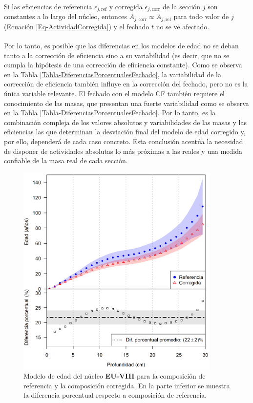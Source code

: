 Si las eficiencias de referencia $\epsilon_{j, \text{ref}}$ y corregida $\epsilon_{j, \text{corr}}$ de la sección $j$ son constantes a lo largo del núcleo, entonces $A_{j, \text{corr}} \propto A_{j, \text{ref}}$ para todo valor de $j$ (Ecuación \ref{Eq-ActividadCorregida}) y el fechado $t$ no se ve afectado.
\\
\\
Por lo tanto, es posible que las diferencias en los modelos de edad no se deban tanto a la corrección de eficiencia sino a su variabilidad (es decir, que no se cumpla la hipótesis de una corrección de eficiencia constante). Como se observa en la Tabla \ref{Tabla-DiferenciasPorcentualesFechado}, la variabilidad de la corrección de eficiencia también influye en la corrección del fechado, pero no es la única variable relevante. El fechado con el modelo CF también requiere el conocimiento de las masas, que presentan una fuerte variabilidad como se observa en la Tabla \ref{Tabla-DiferenciasPorcentualesFechado}. Por lo tanto, es la combinación compleja de los valores absolutos y variabilidades de las masas y las eficiencias las que determinan la desviación final del modelo de edad corregido y, por ello, dependerá de cada caso concreto. Esta conclusión acentúa la necesidad de disponer de actividades absolutas lo más próximas a las reales y una medida confiable de la masa real de cada sección.
\begin{figure}[h]
\centering
\includegraphics[width=0.9\textwidth]{Imagenes/EUVIII_1.png}
\caption{Modelo de edad del núcleo \textbf{EU-VIII} para la composición de referencia y la composición corregida. En la parte inferior se muestra la diferencia porcentual respecto a composición de referencia.}\label{ModeloEdad-EUVIII}
\end{figure}

